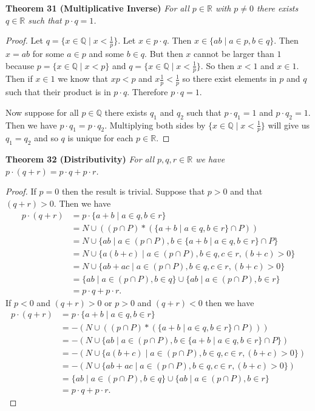 \documentclass{article}
\begin{document}
\begin{flushleft}
\textbf{Theorem 31 (Multiplicative Inverse)}
\textsl{For all $p \in \mathbb{R}$ with $p \neq 0$ there exists $q \in \mathbb{R}$ such that $p \cdot q = 1$.}
\begin{proof}
Let $q = \{x \in \mathbb{Q} \mid x<\frac{1}{p}\}$. Let $x \in p \cdot q$. Then $x \in \{ab \mid a \in p, b \in q\}$. Then $x=ab$ for some $a \in p$ and some $b \in q$. But then $x$ cannot be larger than $1$ because $p = \{x \in \mathbb{Q} \mid x<p\}$ and $q = \{x \in \mathbb{Q} \mid x<\frac{1}{p}\}$. So then $x<1$ and $x \in 1$. Then if $x \in 1$ we know that $xp<p$ and $x \frac{1}{p}<\frac{1}{p}$ so there exist elements in $p$ and $q$ such that their product is in $p \cdot q$. Therefore $p \cdot q = 1$.\newline

Now suppose for all $p \in \mathbb{Q}$ there exists $q_1$ and $q_2$ such that $p \cdot q_1 = 1$ and $p \cdot q_2= 1$. Then we have $p \cdot q_1=p \cdot q_2$. Multiplying both sides by $\{x \in \mathbb{Q} \mid x<\frac{1}{p}\}$ will give us $q_1=q_2$ and so $q$ is unique for each $p \in \mathbb{R}$.
\end{proof}

\textbf{Theorem 32 (Distributivity)}
\textsl{For all $p,q,r \in \mathbb{R}$ we have $p \cdot (q+r) = p \cdot q + p \cdot r$.}
\begin{proof}
If $p=0$ then the result is trivial. Suppose that $p>0$ and that $(q+r)>0$. Then we have
\begin{align*}
p \cdot (q+r) &= p \cdot \{a+b \mid a \in q, b \in r\} \\
		    &= N \cup ((p \cap P) * (\{a+b \mid a \in q, b \in r\} \cap P)) \\
		    &= N \cup \{ab \mid a \in (p \cap P), b \in \{a+b \mid a \in q, b \in r\} \cap P\} \\
		    &= N \cup \{a(b+c) \mid a \in (p \cap P), b \in q, c \in r, (b+c)>0\} \\
		    &= N \cup \{ab+ac \mid a \in (p \cap P), b \in q, c \in r, (b+c)>0\} \\
		    &= \{ab \mid a \in (p \cap P), b \in q\} \cup \{ab \mid a \in (p \cap P), b \in r\} \\
		    &= p \cdot q + p \cdot r.
\end{align*}
If $p<0$ and $(q+r)>0$ or $p>0$ and $(q+r)<0$ then we have
\begin{align*}
p \cdot (q+r) &= p \cdot \{a+b \mid a \in q, b \in r\} \\
		    &= -(N \cup ((p \cap P) * (\{a+b \mid a \in q, b \in r\} \cap P))) \\
		    &= -(N \cup \{ab \mid a \in (p \cap P), b \in \{a+b \mid a \in q, b \in r\} \cap P\}) \\
		    &= -(N \cup \{a(b+c) \mid a \in (p \cap P), b \in q, c \in r, (b+c)>0\}) \\
		    &= -(N \cup \{ab+ac \mid a \in (p \cap P), b \in q, c \in r, (b+c)>0\}) \\
		    &= \{ab \mid a \in (p \cap P), b \in q\} \cup \{ab \mid a \in (p \cap P), b \in r\} \\
		    &= p \cdot q + p \cdot r.
\end{align*}
\end{proof}


\end{flushleft}
\end{document}
